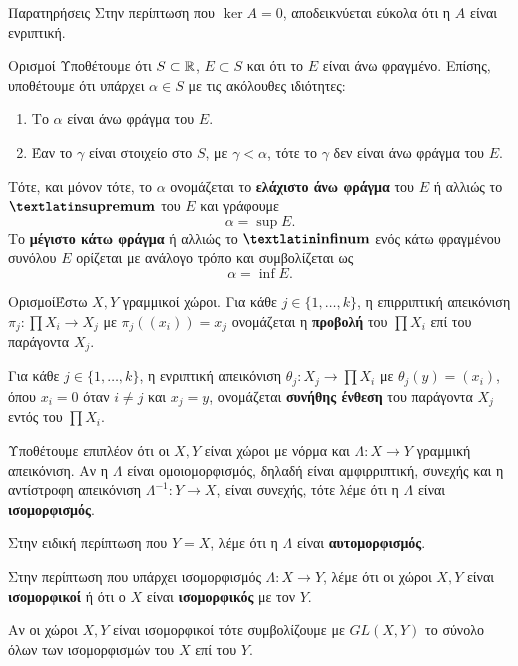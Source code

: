 \begin{nameddefn*}{Παρατηρήσεις} Στην περίπτωση που $\ker A =0$, αποδεικνύεται
    εύκολα ότι η $A$ είναι ενριπτική. \cite{Jnich1994}    
\end{nameddefn*}
\begin{nameddefn}{Ορισμοί}
    Υποθέτουμε ότι $S \subset \mathbb{R}$, $E\subset S$ και ότι το $E$ είναι άνω 
    φραγμένο. Επίσης, υποθέτουμε ότι υπάρχει $\alpha \in S$ με τις ακόλουθες 
    ιδιότητες:
    \begin{enumerate}
        \item Το $\alpha$ είναι άνω φράγμα του $E$.
        \item Έαν το $\gamma$ είναι στοιχείο στο $S$, με $\gamma < \alpha$, τότε 
        το $\gamma$ δεν είναι άνω φράγμα του $E$. 
    \end{enumerate}
    Τότε, και μόνον τότε, το $\alpha$ ονομάζεται το \textbf{ελάχιστο άνω φράγμα}
    του $E$ ή αλλιώς το $\textbf{\tl{supremum}}$  του $E$ και γράφουμε 
    \begin{equation*}
        \alpha = \sup E.
    \end{equation*} 
    Το \textbf{μέγιστο κάτω φράγμα} ή αλλιώς το $\textbf{\tl{infinum}}$ ενός 
    κάτω φραγμένου συνόλου $E$ ορίζεται με ανάλογο τρόπο και συμβολίζεται ως
    \begin{equation*}
        \alpha = \inf E.
    \end{equation*}
\end{nameddefn}
\begin{nameddefn}{Ορισμοί}Έστω $X, Y$ γραμμικοί χώροι. Για κάθε $j\in \{1, 
    \ldots, k\}$, η επιρριπτική απεικόνιση $\pi_{j}:\prod X_{i} \rightarrow 
    X_{j}$ με $\pi_{j}\left(\left(x_{i}\right)\right) = x_{j}$ ονομάζεται η 
    \textbf{προβολή} του $\prod X_{i}$ επί του παράγοντα $X_{j}$.

    Για κάθε $j\in \{1, \ldots, k\}$, η ενριπτική απεικόνιση $\theta_{j}:X_{j} 
    \rightarrow \prod X_{i}$ με $\theta_{j}(y) = (x_{i})$, όπου $x_{i} = 0$ 
    όταν $i\neq j$ και $x_{j} = y$, ονομάζεται \textbf{συνήθης ένθεση} του 
    παράγοντα $X_{j}$ εντός του $\prod X_{i}$.

    Υποθέτουμε επιπλέον ότι οι $X, Y$ είναι χώροι με νόρμα και $\Lambda:X
    \rightarrow Y$ γραμμική απεικόνιση. Αν η $\Lambda$ είναι ομοιομορφισμός, 
    δηλαδή είναι αμφιρριπτική, συνεχής και η αντίστροφη απεικόνιση 
    $\Lambda^{-1}:Y \rightarrow X$, είναι συνεχής, τότε λέμε ότι η $\Lambda$ 
    είναι \textbf{ισομορφισμός}. 
    
    Στην ειδική περίπτωση που $Y = X$, λέμε ότι η $\Lambda$ είναι 
    \textbf{αυτομορφισμός}.
    
    Στην περίπτωση που υπάρχει ισομορφισμός $\Lambda:X\rightarrow Y$, λέμε ότι 
    οι χώροι $X,Y$ είναι \textbf{ισομορφικοί} ή ότι ο $X$ είναι 
    \textbf{ισομορφικός} με 
    τον $Y$.
    
    Αν οι χώροι $X,Y$ είναι ισομορφικοί τότε συμβολίζουμε με $GL\left(X, 
    Y\right)$ το σύνολο όλων των ισομορφισμών του $X$ επί του $Y$.
\end{nameddefn}


